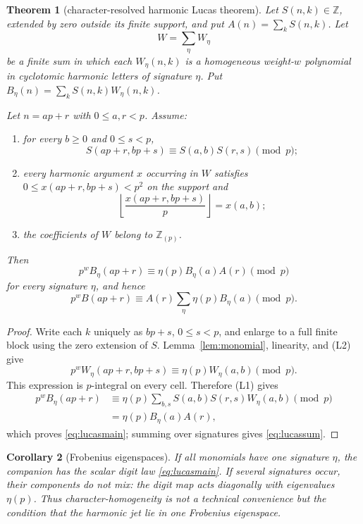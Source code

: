 \documentclass[11pt]{article}
\newtheorem{theorem}{Theorem}[section]
\newtheorem{corollary}[theorem]{Corollary}
\theoremstyle{definition}
\theoremstyle{remark}
\newcommand{\Z}{\mathbb Z}
\newcommand{\Zp}{\mathbb Z_{(p)}}
\begin{document}
\begin{theorem}[character-resolved harmonic Lucas theorem]\label{thm:lucas}
Let $S(n,k)\in\Z$, extended by zero outside its finite support, and put
$A(n)=\sum_kS(n,k)$.  Let
\[
 W=\sum_\eta W_\eta
\]
be a finite sum in which each $W_\eta(n,k)$ is a homogeneous weight-$w$ polynomial in
cyclotomic harmonic letters of signature $\eta$.  Put
$B_\eta(n)=\sum_kS(n,k)W_\eta(n,k)$.

Let $n=ap+r$ with $0\le a,r<p$.  Assume:
\begin{enumerate}[label=\textup{(L\arabic*)},leftmargin=2.4em]
\item for every $b\ge0$ and $0\le s<p$,
\[
 S(ap+r,bp+s)\equiv S(a,b)S(r,s)\pmod p;
\]
\item every harmonic argument $x$ occurring in $W$ satisfies
$0\le x(ap+r,bp+s)<p^2$ on the support and
\[
 \left\lfloor\frac{x(ap+r,bp+s)}p\right\rfloor=x(a,b);
\]
\item the coefficients of $W$ belong to $\Zp$.
\end{enumerate}
Then
\begin{equation}\label{eq:lucasmain}
 p^wB_\eta(ap+r)\equiv \eta(p)B_\eta(a)A(r)\pmod p
\end{equation}
for every signature $\eta$, and hence
\begin{equation}\label{eq:lucassum}
 p^wB(ap+r)\equiv A(r)\sum_\eta\eta(p)B_\eta(a)\pmod p.
\end{equation}
\end{theorem}

\begin{proof}
Write each $k$ uniquely as $bp+s$, $0\le s<p$, and enlarge to a full finite block using
the zero extension of $S$.  Lemma~\ref{lem:monomial}, linearity, and (L2) give
\[
 p^wW_\eta(ap+r,bp+s)\equiv\eta(p)W_\eta(a,b)\pmod p.
\]
This expression is $p$-integral on every cell.  Therefore (L1) gives
\begin{align*}
 p^wB_\eta(ap+r)
 &\equiv\eta(p)\sum_{b,s}S(a,b)S(r,s)W_\eta(a,b)\pmod p\\
 &=\eta(p)B_\eta(a)A(r),
\end{align*}
which proves \eqref{eq:lucasmain}; summing over signatures gives
\eqref{eq:lucassum}.
\end{proof}

\begin{corollary}[Frobenius eigenspaces]\label{cor:eigenspaces}
If all monomials have one signature $\eta$, the companion has the scalar digit law
\eqref{eq:lucasmain}.  If several signatures occur, their components do not mix: the
digit map acts diagonally with eigenvalues $\eta(p)$.  Thus character-homogeneity is not a
technical convenience but the condition that the harmonic jet lie in one Frobenius
eigenspace.
\end{corollary}
\end{document}
